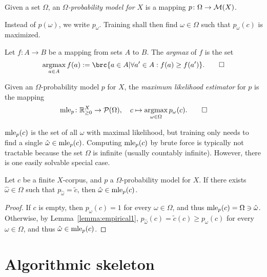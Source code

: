 \begin{definition}
 Given a set $\Omega$, an \emph{$\Omega$-probability model for $X$} is a
 mapping $p\colon\Omega\to\mathcal M(X)$.
\end{definition}

Instead of $p(\omega)$, we write $p_\omega$. Training shall then find
$\omega\in\Omega$ such that $p_\omega(c)$ is maximized.

\begin{definition}
 Let $f\colon A\to B$ be a mapping from sets $A$ to $B$. The \emph{argmax} of $f$ is the set
 \[
  \argmax_{a\in A} f(a) := \brc{a\in A|\forall a'\in A: f(a) \geq f(a')}.\qedhere
 \]
\end{definition}

\begin{definition}
 Given an $\Omega$-probability model $p$ for $X$, the
 \emph{maximum likelihood estimator} for $p$ is the mapping
 \[
  \mle_p\colon \zr_{\geq0}^X \to \up(\Omega),
  \quad
  c \mapsto \argmax_{\omega\in\Omega} p_\omega(c).\qedhere
 \]
\end{definition}

$\operatorname{mle}_p(c)$ is the set of all $\omega$ with maximal likelihood, but training
only needs to find a single $\hat\omega \in \operatorname{mle}_p(c)$. Computing $\operatorname{mle}_p(c)$
by brute force is typically not tractable because the set $\Omega$ is infinite
(usually countably infinite). However, there is one easily solvable special
case.

\begin{lemma}\label{lemma:empirical2}
 Let $c$ be a finite $X$-corpus, and $p$ a $\Omega$-probability model for $X$.
 If there exists $\hat\omega\in\Omega$ such that $p_{\hat\omega} = \tilde c$,
 then $\hat\omega\in\operatorname{mle}_p(c)$.
\end{lemma}

\begin{proof}
 If $c$ is empty, then $p_\omega(c) = 1$ for every $\omega\in\Omega$, and thus
 $\operatorname{mle}_p(c) = \Omega \ni \hat\omega$. Otherwise, by
 Lemma~\ref{lemma:empirical1}, $p_{\hat\omega}(c) = \tilde c(c) \geq
 p_\omega(c)$ for every $\omega\in\Omega$, and thus $\hat\omega \in \operatorname{mle}_p(c)$.
\end{proof}

\section{Algorithmic skeleton}

